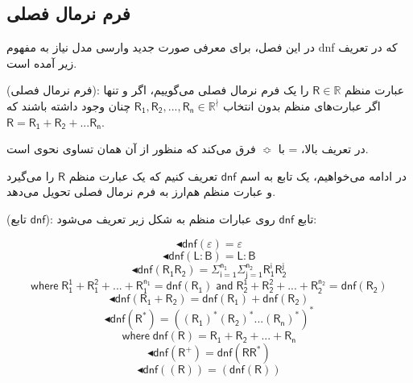 \subsection{فرم نرمال فصلی}

	 در این فصل، برای معرفی صورت جدید وارسی مدل نیاز به مفهوم \gls{dnf} که در تعریف زیر آمده است.
	 \begin{defn}
	 	(فرم نرمال فصلی): عبارت منظم 
	 	$\mathsf{R} \in \mathbb{R}$
	 	را یک فرم نرمال فصلی می‌گوییم، اگر و تنها اگر عبارت‌های منظم بدون انتخاب
	 	$\mathsf{R_1 , R_2, ..., R_n} \in \mathbb{R}^{\nmid}$
	 	چنان وجود داشته باشند که 
	 	$\mathsf{R= R_1 + R_2 + ... R_n}$.
	 \end{defn}
 در تعریف بالا، = با 
 $\Bumpeq$
فرق می‌کند که منظور از آن همان تساوی نحوی است.
 
 در ادامه می‌خواهیم، یک تابع به اسم $\mathsf{dnf}$ تعریف کنیم که یک عبارت منظم $\mathsf{R}$ را می‌گیرد و عبارت منظم هم‌ارز به فرم نرمال فصلی تحویل می‌دهد.
 
  
  \begin{defn}
  	(تابع $\mathsf{dnf}$): تابع $\mathsf{dnf}$ روی عبارات منظم به شکل زیر تعریف می‌شود:
  	
  	$$\blacktriangleleft\mathsf{dnf}(\varepsilon)=\varepsilon$$
  	$$\blacktriangleleft\mathsf{dnf}(\mathsf{L:B})=\mathsf{L:B}$$
  	$$\blacktriangleleft\mathsf{dnf}(\mathsf{R_1 R_2})= \mathsf{\Sigma_{i=1}^{n_1} \Sigma_{j=1}^{n_2} R_1^i R_2^j }$$
  	$$\mathsf{where\;R_1^1 + R_1^2 + ... + R_1^{n_1} = dnf(R_1)\;and\; R_2^1 + R_2^2 + ... + R_2^{n_2}= dnf(R_2)}$$
   $$\blacktriangleleft\mathsf{dnf (R_1+R_2)=dnf(R_1)+dnf(R_2)}$$
   $$\blacktriangleleft\mathsf{dnf (R^*)}= \mathsf{((R_1)^* (R_2)^* ... (R_n)^*)^*}$$
   $$\mathsf{where\;dnf(R)=R_1+R_2+...+R_n}$$
   $$\blacktriangleleft\mathsf{dnf(R^+)=dnf(RR^*)}$$
   $$\blacktriangleleft\mathsf{ dnf((R)) = ( dnf(R) ) }$$  
   	
  \end{defn}

